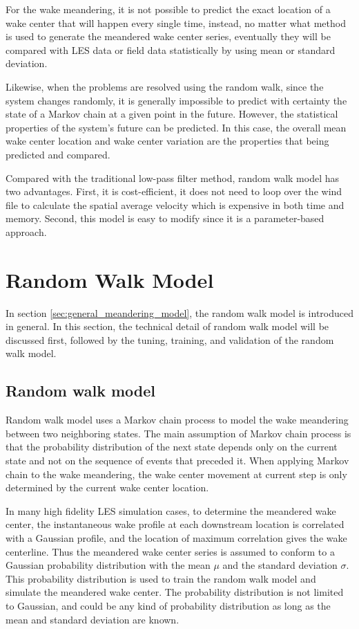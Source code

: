 \documentclass{umthesis}
\begin{document}
For the wake meandering, it is not possible to predict the exact location of a wake center that will happen every single time, instead, no matter what method is used to generate the meandered wake center series, eventually they will be compared with LES data or field data statistically by using mean or standard deviation. 

Likewise, when the problems are resolved using the random walk, since the system changes randomly, it is generally impossible to predict with certainty the state of a Markov chain at a given point in the future. However, the statistical properties of the system's future can be predicted. In this case, the overall mean wake center location and wake center variation are the properties that being predicted and compared.

Compared with the traditional low-pass filter method, random walk model has two advantages. First, it is cost-efficient, it does not need to loop over the wind file to calculate the spatial average velocity which is expensive in both time and memory. Second, this model is easy to modify since it is a parameter-based approach.  
  
\section{Random Walk Model}\label{sec:rw_model}
In section \ref{sec:general_meandering_model}, the random walk model is introduced in general. In this section, the technical detail of random walk model will be discussed first, followed by the tuning, training, and validation of the random walk model.

\subsection{Random walk model}
Random walk model uses a Markov chain process to model the wake meandering between two neighboring states. The main assumption of Markov chain process is that the probability distribution of the next state depends only on the current state and not on the sequence of events that preceded it. When applying Markov chain to the wake meandering, the wake center movement at current step is only determined by the current wake center location.

In many high fidelity LES simulation cases, to determine the meandered wake center, the instantaneous wake profile at each downstream location is correlated with a Gaussian profile, and the location of maximum correlation gives the wake centerline. Thus the meandered wake center series is assumed to conform to a Gaussian probability distribution with the mean $\mu$ and the standard deviation $\sigma$. This probability distribution is used to train the random walk model and simulate the meandered wake center. The probability distribution is not limited to Gaussian, and could be any kind of probability distribution as long as the mean and standard deviation are known.
\end{document}
